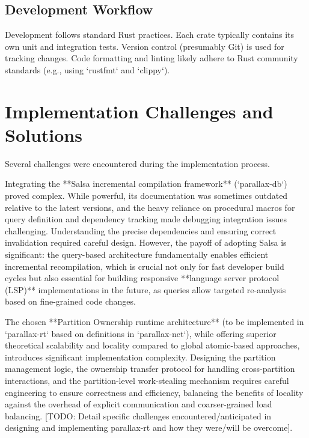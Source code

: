 \subsection{Development Workflow} %
Development follows standard Rust practices. Each crate typically contains its own unit and integration tests. Version control (presumably Git) is used for tracking changes. Code formatting and linting likely adhere to Rust community standards (e.g., using `rustfmt` and `clippy`).

\section{Implementation Challenges and Solutions} %
Several challenges were encountered during the implementation process.

Integrating the **Salsa incremental compilation framework** (`parallax-db`) proved complex. While powerful, its documentation was sometimes outdated relative to the latest versions, and the heavy reliance on procedural macros for query definition and dependency tracking made debugging integration issues challenging. Understanding the precise dependencies and ensuring correct invalidation required careful design. However, the payoff of adopting Salsa is significant: the query-based architecture fundamentally enables efficient incremental recompilation, which is crucial not only for fast developer build cycles but also essential for building responsive **language server protocol (LSP)** implementations in the future, as queries allow targeted re-analysis based on fine-grained code changes.

The chosen **Partition Ownership runtime architecture** (to be implemented in `parallax-rt` based on definitions in `parallax-net`), while offering superior theoretical scalability and locality compared to global atomic-based approaches, introduces significant implementation complexity. Designing the partition management logic, the ownership transfer protocol for handling cross-partition interactions, and the partition-level work-stealing mechanism requires careful engineering to ensure correctness and efficiency, balancing the benefits of locality against the overhead of explicit communication and coarser-grained load balancing. [TODO: Detail specific challenges encountered/anticipated in designing and implementing parallax-rt and how they were/will be overcome].

